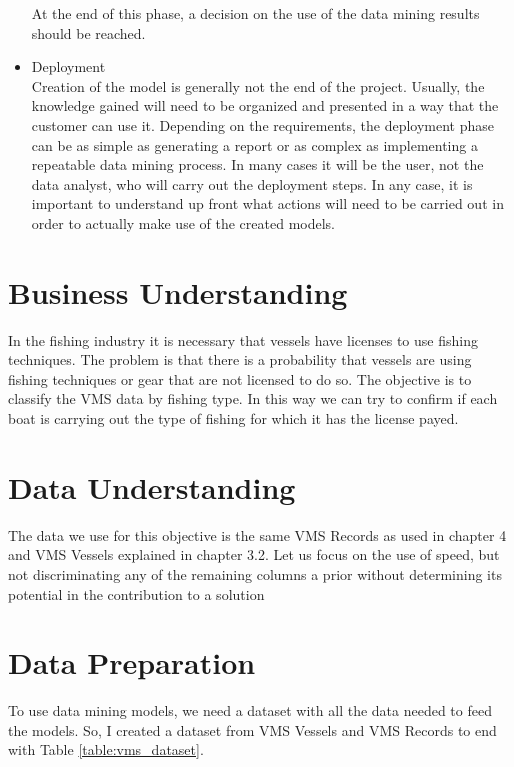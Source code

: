 \begin{itemize}
At the end of this phase, a decision on the use of the data mining results should be reached.
\item Deployment\\
Creation of the model is generally not the end of the project. Usually, the knowledge gained
will need to be organized and presented in a way that the customer can use it. Depending on
the requirements, the deployment phase can be as simple as generating a report or as complex
as implementing a repeatable data mining process. In many cases it will be the user, not the
data analyst, who will carry out the deployment steps. In any case, it is important to
understand up front what actions will need to be carried out in order to actually make use of
the created models.
\end{itemize}



\section{Business Understanding} %
\label{sub:business_understanding}

In the fishing industry it is necessary that vessels have licenses to use fishing techniques.
The problem is that there is a probability that vessels are using fishing techniques or gear that are not licensed to do so.
The objective is to classify the VMS data by fishing type. 
In this way we can try to confirm if each boat is carrying out the type of fishing for which it has the license payed.





\section{Data Understanding} %
\label{sub:data_understanding}

The data we use for this objective is the same VMS Records as used in chapter 4 and VMS Vessels explained in chapter 3.2.
Let us focus on the use of speed, but not discriminating any of the remaining columns a prior without determining its potential in the contribution to a solution




\section{Data Preparation} %
\label{sub:data_preparation}
To use data mining models, we need a dataset with all the data needed to feed the models. So, I created a dataset from VMS Vessels and VMS Records to end with Table \ref{table:vms_dataset}. 

